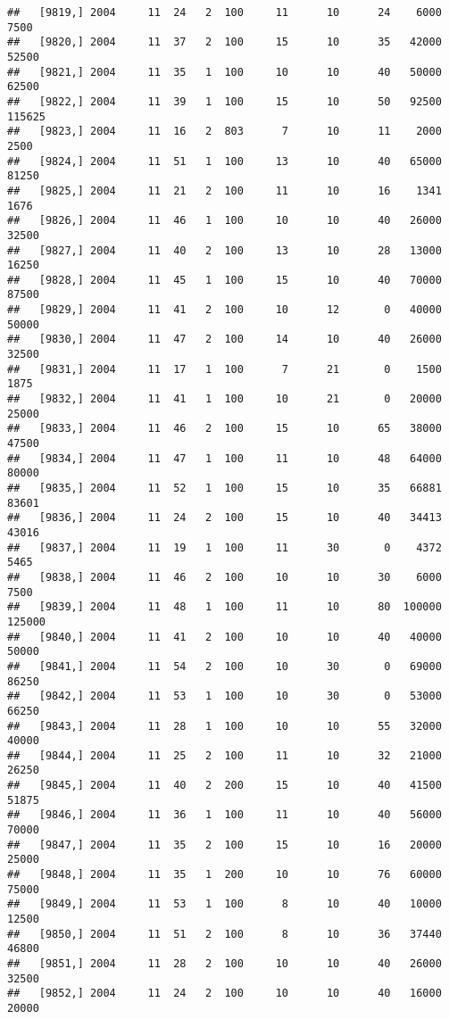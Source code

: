 \documentclass{article}\usepackage[]{graphicx}\usepackage[]{color}
\makeatletter
\newenvironment{kframe}{%
 \def\at@end@of@kframe{}%
 \ifinner\ifhmode%
  \def\at@end@of@kframe{\end{minipage}}%
  \begin{minipage}{\columnwidth}%
 \fi\fi%
 \def\FrameCommand##1{\hskip\@totalleftmargin \hskip-\fboxsep
 \colorbox{shadecolor}{##1}\hskip-\fboxsep
     \hskip-\linewidth \hskip-\@totalleftmargin \hskip\columnwidth}%
 \MakeFramed {\advance\hsize-\width
   \@totalleftmargin\z@ \linewidth\hsize
   \@setminipage}}%
 {\par\unskip\endMakeFramed%
 \at@end@of@kframe}
\newenvironment{knitrout}{}{} %
\makeatother
\begin{document}
\begin{knitrout}
\begin{kframe}
\begin{verbatim}
##   [9819,] 2004     11  24   2  100     11      10      24    6000    7500
##   [9820,] 2004     11  37   2  100     15      10      35   42000   52500
##   [9821,] 2004     11  35   1  100     10      10      40   50000   62500
##   [9822,] 2004     11  39   1  100     15      10      50   92500  115625
##   [9823,] 2004     11  16   2  803      7      10      11    2000    2500
##   [9824,] 2004     11  51   1  100     13      10      40   65000   81250
##   [9825,] 2004     11  21   2  100     11      10      16    1341    1676
##   [9826,] 2004     11  46   1  100     10      10      40   26000   32500
##   [9827,] 2004     11  40   2  100     13      10      28   13000   16250
##   [9828,] 2004     11  45   1  100     15      10      40   70000   87500
##   [9829,] 2004     11  41   2  100     10      12       0   40000   50000
##   [9830,] 2004     11  47   2  100     14      10      40   26000   32500
##   [9831,] 2004     11  17   1  100      7      21       0    1500    1875
##   [9832,] 2004     11  41   1  100     10      21       0   20000   25000
##   [9833,] 2004     11  46   2  100     15      10      65   38000   47500
##   [9834,] 2004     11  47   1  100     11      10      48   64000   80000
##   [9835,] 2004     11  52   1  100     15      10      35   66881   83601
##   [9836,] 2004     11  24   2  100     15      10      40   34413   43016
##   [9837,] 2004     11  19   1  100     11      30       0    4372    5465
##   [9838,] 2004     11  46   2  100     10      10      30    6000    7500
##   [9839,] 2004     11  48   1  100     11      10      80  100000  125000
##   [9840,] 2004     11  41   2  100     10      10      40   40000   50000
##   [9841,] 2004     11  54   2  100     10      30       0   69000   86250
##   [9842,] 2004     11  53   1  100     10      30       0   53000   66250
##   [9843,] 2004     11  28   1  100     10      10      55   32000   40000
##   [9844,] 2004     11  25   2  100     11      10      32   21000   26250
##   [9845,] 2004     11  40   2  200     15      10      40   41500   51875
##   [9846,] 2004     11  36   1  100     11      10      40   56000   70000
##   [9847,] 2004     11  35   2  100     15      10      16   20000   25000
##   [9848,] 2004     11  35   1  200     10      10      76   60000   75000
##   [9849,] 2004     11  53   1  100      8      10      40   10000   12500
##   [9850,] 2004     11  51   2  100      8      10      36   37440   46800
##   [9851,] 2004     11  28   2  100     10      10      40   26000   32500
##   [9852,] 2004     11  24   2  100     10      10      40   16000   20000

\end{verbatim}
\end{kframe}
\end{knitrout}
\end{document}
